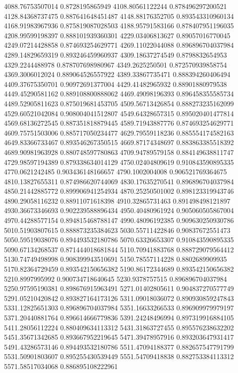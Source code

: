 {4088.76753507014 0.8728195865949
4108.80561122244 0.878496297200521
4128.84368737475 0.887641648451487
4148.88176352705 0.893543310960134
4168.91983967936 0.875819087028503
4188.95791583166 0.878407951196035
4208.99599198397 0.888101939360301
4229.03406813627 0.89057016770045
4249.07214428858 0.874693254629771
4269.11022044088 0.896896704037984
4289.14829659319 0.893246459960937
4309.18637274549 0.8798832654953
4329.2244488978 0.878707698980967
4349.2625250501 0.872570939858754
4369.3006012024 0.889064526557922
4389.33867735471 0.888394260406494
4409.37675350701 0.90972691377004
4429.41482965932 0.88901880979538
4449.45290581162 0.889108800888062
4469.49098196393 0.896458355585734
4489.52905811623 0.875019681453705
4509.56713426854 0.888273235162099
4529.60521042084 0.908004041512807
4549.64328657315 0.895020401477814
4569.68136272545 0.887351818879445
4589.71943887776 0.874693254629771
4609.75751503006 0.885717050234477
4629.79559118236 0.885554174582163
4649.83366733467 0.893546267350515
4669.87174348697 0.883863385518392
4689.90981963928 0.880748597780863
4709.94789579158 0.884149638811747
4729.98597194389 0.879338634014129
4750.02404809619 0.910843590895335
4770.0621242485 0.903436148166657
4790.1002004008 0.906521769364675
4810.13827655311 0.874986620744069
4830.17635270541 0.896896704037984
4850.21442885772 0.899906941254934
4870.25250501002 0.898123319943746
4890.29058116232 0.88911071618398
4910.32865731463 0.891498498121897
4930.36673346693 0.902239588896434
4950.40480961924 0.905060505867004
4970.44288577154 0.894815468788147
4990.48096192385 0.909630250930786
5010.51903807615 0.888873235384623
5030.55711422846 0.90837672551473
5050.59519038076 0.894493532180786
5070.63326653307 0.910843590895335
5090.67134268537 0.871444018681844
5110.70941883768 0.888729079564412
5130.74749498998 0.908399943510691
5150.78557114228 0.8802689909935
5170.82364729459 0.893542150656382
5190.86172344689 0.893542150656382
5210.8997995992 0.900734718640645
5230.9378757515 0.896896704037984
5250.97595190381 0.898676915963491
5271.01402805611 0.904837270577749
5291.05210420842 0.893827164173126
5311.09018036072 0.890930859247843
5331.12825651303 0.896896704037984
5351.16633266533 0.896909979979197
5371.20440881764 0.896614666779836
5391.24248496994 0.897319916884105
5411.28056112224 0.880409634113312
5431.31863727455 0.895576238632202
5451.35671342685 0.893667952219645
5471.39478957916 0.893203647931417
5491.43286573146 0.894493532180786
5511.47094188377 0.882657547791799
5531.50901803607 0.895255430539449
5551.54709418838 0.882753384113312
5571.58517034068 0.886895108222961
}
